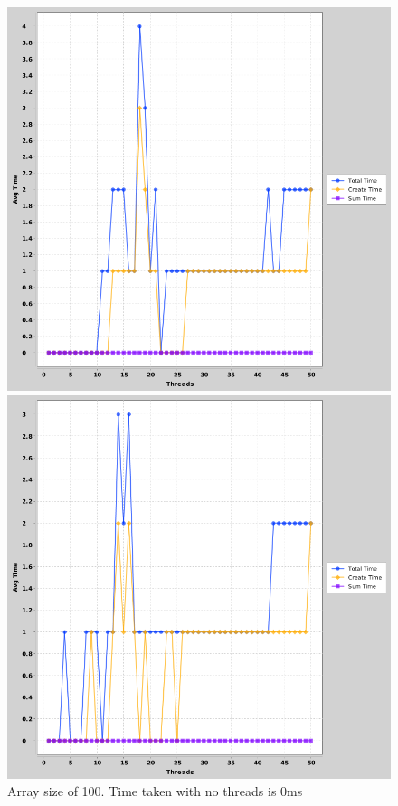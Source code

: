 \documentclass[a4paper, 12pt]{article}
\begin{document}
		\begin{figure}[H]
  \includegraphics[width=\linewidth]{threads-vs-time-100-global.png}
  \caption{Array size of 100. Time taken with no threads is 0ms}
\endminipage\hfill
{}
  \includegraphics[width=\linewidth]{threads-vs-time-1000-global.png}

\end{figure}
\end{document}
